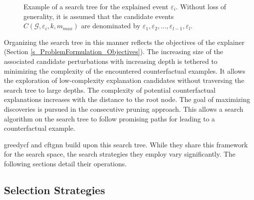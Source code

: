 

\begin{figure} [ht]
    \centering
    
    \caption{Example of a search tree for the explained event $\varepsilon_i$. Without loss of generality, it is assumed that the candidate events $C(\mathcal{G}, \varepsilon_i, k, m_{max})$ are denominated by $\varepsilon_1, \varepsilon_2, ..., \varepsilon_{l - 1}, \varepsilon_{l}$.}
    \label{f_SearchTree_Example}
\end{figure}

Organizing the search tree in this manner reflects the objectives of the explainer (Section \ref{s_ProblemFormulation_Objectives}). The increasing size of the associated candidate perturbations with increasing depth is tethered to minimizing the complexity of the encountered counterfactual examples. It allows the exploration of low-complexity explanation candidates without traversing the search tree to large depths. The complexity of potential counterfactual explanations increases with the distance to the root node. The goal of maximizing discoveries is pursued in the consecutive pruning approach. This allows a search algorithm on the search tree to follow promising paths for leading to a counterfactual example.

\gls{greedycf} and \gls{cftgnn} build upon this search tree. While they share this framework for the search space, the search strategies they employ vary significantly. The following sections detail their operations.


\FloatBarrier
\subsection{Selection Strategies}
\label{s_Methodology_SelectionStrategies}

